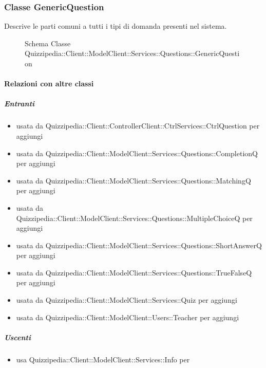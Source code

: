 \subsubsection{Classe GenericQuestion}
Descrive le parti comuni a tutti i tipi di domanda presenti nel sistema.
\begin{figure}[H]
\centering
\noindent{}
\caption[Schema Classe GenericQuestion]{Schema Classe Quizzipedia::Client::ModelClient::Services::Questions::GenericQuestion}
\end{figure}
\paragraph{Relazioni con altre classi}
\subparagraph{Entranti}
\begin{itemize}
\item usata da Quizzipedia::Client::ControllerClient::CtrlServices::CtrlQuestion per aggiungi
\item usata da Quizzipedia::Client::ModelClient::Services::Questions::CompletionQ per aggiungi
\item usata da Quizzipedia::Client::ModelClient::Services::Questions::MatchingQ per aggiungi
\item usata da Quizzipedia::Client::ModelClient::Services::Questions::MultipleChoiceQ per aggiungi
\item usata da Quizzipedia::Client::ModelClient::Services::Questions::ShortAnswerQ per aggiungi
\item usata da Quizzipedia::Client::ModelClient::Services::Questions::TrueFalseQ per aggiungi
\item usata da Quizzipedia::Client::ModelClient::Services::Quiz per aggiungi
\item usata da Quizzipedia::Client::ModelClient::Users::Teacher per aggiungi
\end{itemize}
\subparagraph{Uscenti}
\begin{itemize}
\item usa Quizzipedia::Client::ModelClient::Services::Info per 
\end{itemize}
